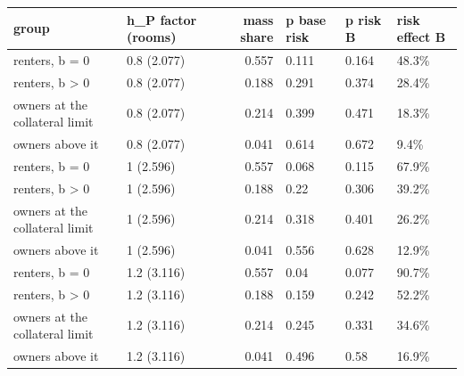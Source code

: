 \begingroup\small
\setlength{\tabcolsep}{3pt}
\renewcommand{\arraystretch}{1.04}
\begin{tabularx}{\linewidth}{XXrXXX}
\toprule
group & h\_P factor (rooms) & mass share & p base risk & p risk B & risk effect B \\
\midrule
renters, b = 0 & 0.8 (2.077) & 0.557 & 0.111 & 0.164 & 48.3\% \\
renters, b \textgreater{} 0 & 0.8 (2.077) & 0.188 & 0.291 & 0.374 & 28.4\% \\
owners at the collateral limit & 0.8 (2.077) & 0.214 & 0.399 & 0.471 & 18.3\% \\
owners above it & 0.8 (2.077) & 0.041 & 0.614 & 0.672 & 9.4\% \\
renters, b = 0 & 1 (2.596) & 0.557 & 0.068 & 0.115 & 67.9\% \\
renters, b \textgreater{} 0 & 1 (2.596) & 0.188 & 0.22 & 0.306 & 39.2\% \\
owners at the collateral limit & 1 (2.596) & 0.214 & 0.318 & 0.401 & 26.2\% \\
owners above it & 1 (2.596) & 0.041 & 0.556 & 0.628 & 12.9\% \\
renters, b = 0 & 1.2 (3.116) & 0.557 & 0.04 & 0.077 & 90.7\% \\
renters, b \textgreater{} 0 & 1.2 (3.116) & 0.188 & 0.159 & 0.242 & 52.2\% \\
owners at the collateral limit & 1.2 (3.116) & 0.214 & 0.245 & 0.331 & 34.6\% \\
owners above it & 1.2 (3.116) & 0.041 & 0.496 & 0.58 & 16.9\% \\
\bottomrule
\end{tabularx}
\endgroup
